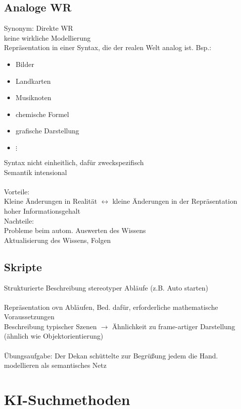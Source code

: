 \documentclass[a4paper,14pt]{article}
\begin{document}
\subsection{Analoge WR}
Synonym: Direkte WR\\
keine wirkliche Modellierung\\
Repräsentation in einer Syntax, die der realen Welt \glqq{}analog\grqq{} ist.
Bsp.:
\begin{itemize}
 \item Bilder
 \item Landkarten
 \item Musiknoten
 \item chemische Formel
 \item grafische Darstellung
 \item $\vdots$
\end{itemize}

Syntax nicht einheitlich, dafür zweckspezifisch\\
Semantik intensional\\
\\
Vorteile:\\
Kleine Änderungen in Realität $\leftrightarrow$ kleine Änderungen in der Repräsentation\\
hoher Informationsgehalt\\
Nachteile:\\
Probleme beim autom. Auswerten des Wissens\\
Aktualisierung des Wissens, Folgen\\

\subsection{Skripte}
Strukturierte Beschreibung stereotyper Abläufe (z.B. Auto starten)\\
\\
Repräsentation ovn Abläufen, Bed. dafür, erforderliche mathematische Voraussetzungen\\
Beschreibung typischer Szenen $\rightarrow$ Ähnlichkeit zu frame-artiger Darstellung (ähnlich wie Objektorientierung)\\
\\
Übungsaufgabe: \glqq{}Der Dekan schüttelte zur Begrüßung jedem die Hand.\grqq{} modellieren als semantisches Netz

\section{KI-Suchmethoden}
\end{document}

